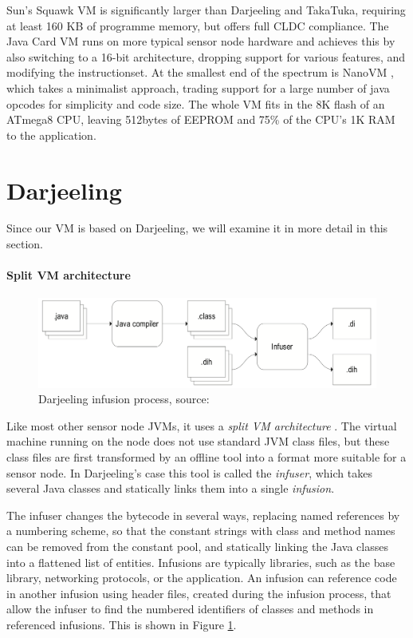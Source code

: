 Sun's Squawk VM \cite{Shaylor:2003ws} is significantly larger than Darjeeling and TakaTuka, requiring at least 160 KB of programme memory, but offers full CLDC compliance. The Java Card VM \cite{javacard} runs on more typical sensor node hardware and achieves this by also switching to a 16-bit architecture, dropping support for various features, and modifying the instructionset. At the smallest end of the spectrum is NanoVM \cite{Harbaum}, which takes a minimalist approach, trading support for a large number of java opcodes for simplicity and code size. The whole VM fits in the 8K flash of an ATmega8 CPU, leaving 512bytes of EEPROM and 75\% of the CPU's 1K RAM to the application.

\section{Darjeeling}
Since our VM is based on Darjeeling, we will examine it in more detail in this section.

\paragraph{Split VM architecture}
\begin{figure}
\centering
\includegraphics[width=0.6\linewidth]{darjeeling-infusion-process}
\caption[Darjeeling infusion process]{Darjeeling infusion process, source: \cite{Brouwers:2009cj}}
\label{fig-darjeeling-infusion-process}
\end{figure}
Like most other sensor node JVMs, it uses a \emph{split VM architecture} \cite{Simon:2006wd}. The virtual machine running on the node does not use standard JVM class files, but these class files are first transformed by an offline tool into a format more suitable for a sensor node. In Darjeeling's case this tool is called the \emph{infuser}, which takes several Java classes and statically links them into a single \emph{infusion}.

The infuser changes the bytecode in several ways, replacing named references by a numbering scheme, so that the constant strings with class and method names can be removed from the constant pool, and statically linking the Java classes into a flattened list of entities. Infusions are typically libraries, such as the  base library, networking protocols, or the application. An infusion can reference code in another infusion using header files, created during the infusion process, that allow the infuser to find the numbered identifiers of classes and methods in referenced infusions. This is shown in Figure \ref{fig-darjeeling-infusion-process}.

